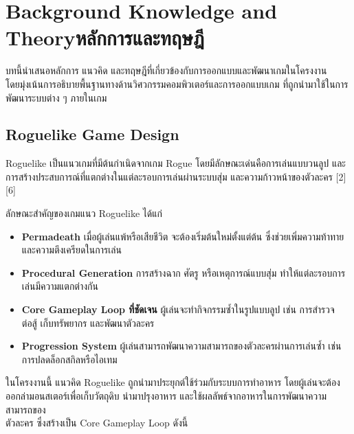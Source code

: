 \chapter{\ifenglish Background Knowledge and Theory\else หลักการและทฤษฎี\fi}

\hspace{1.5em}บทนี้นำเสนอหลักการ แนวคิด และทฤษฎีที่เกี่ยวข้องกับการออกแบบและพัฒนาเกมในโครงงาน \\โดยมุ่งเน้นการอธิบายพื้นฐานทางด้านวิศวกรรมคอมพิวเตอร์และการออกแบบเกม ที่ถูกนำมาใช้ในการพัฒนาระบบต่าง ๆ ภายในเกม

\section{Roguelike Game Design}
\hspace{1.5em}Roguelike เป็นแนวเกมที่มีต้นกำเนิดจากเกม Rogue โดยมีลักษณะเด่นคือการเล่นแบบวนลูป และการสร้างประสบการณ์ที่แตกต่างในแต่ละรอบการเล่นผ่านระบบสุ่ม และความก้าวหน้าของตัวละคร [2][6]\par
\vspace{1\baselineskip}
ลักษณะสำคัญของเกมแนว Roguelike ได้แก่
\begin{itemize}
    \item \textbf{Permadeath}\newline
    \hspace{1.5em}เมื่อผู้เล่นแพ้หรือเสียชีวิต จะต้องเริ่มต้นใหม่ตั้งแต่ต้น ซึ่งช่วยเพิ่มความท้าทายและความตึงเครียดในการเล่น
    \item \textbf{Procedural Generation}\newline
    \hspace{1.5em}การสร้างฉาก ศัตรู หรือเหตุการณ์แบบสุ่ม ทำให้แต่ละรอบการเล่นมีความแตกต่างกัน
    \item \textbf{Core Gameplay Loop ที่ชัดเจน}\newline
    \hspace{1.5em}ผู้เล่นจะทำกิจกรรมซ้ำในรูปแบบลูป เช่น การสำรวจ ต่อสู้ เก็บทรัพยากร และพัฒนาตัวละคร
    \item \textbf{Progression System}\newline
    \hspace{1.5em}ผู้เล่นสามารถพัฒนาความสามารถของตัวละครผ่านการเล่นซ้ำ เช่น การปลดล็อกสกิลหรือไอเทม
\end{itemize}

ในโครงงานนี้ แนวคิด Roguelike ถูกนำมาประยุกต์ใช้ร่วมกับระบบการทำอาหาร โดยผู้เล่นจะต้องออกล่ามอนสเตอร์เพื่อเก็บวัตถุดิบ นำมาปรุงอาหาร และใช้ผลลัพธ์จากอาหารในการพัฒนาความสามารถของ\\ตัวละคร ซึ่งสร้างเป็น Core Gameplay Loop ดังนี้


